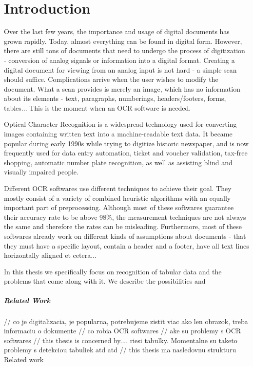 \chapter{Introduction}

Over the last few years, the importance and usage of digital documents has grown rapidly. Today, almost everything can be found in digital form. However, there are still tons of documents that need to undergo the process of digitization - conversion of analog signals or information into a digital format. Creating a digital document for viewing from an analog input is not hard - a simple scan should suffice. Complications arrive when the user wishes to modify the document. What a scan provides is merely an image, which has no information about its elements - text, paragraphs, numberings, headers/footers, forms, tables... This is the moment when an OCR software is needed.

Optical Character Recognition is a widespread technology used for converting images containing written text into a machine-readable text data. It became popular during early 1990s while trying to digitize historic newspaper, and is now frequently used for data entry automation, ticket and voucher validation, tax-free shopping, automatic number plate recognition, as well as assisting blind and visually impaired people.

Different OCR softwares use different techniques to achieve their goal. They mostly consist of a variety of combined heuristic algorithms with an equally important part of preprocessing. Although most of these softwares guarantee their accuracy rate to be above 98\%, the measurement techniques are not always the same and therefore the rates can be misleading.
Furthermore, most of these softwares already work on different kinds of assumptions about documents - that they must have a specific layout, contain a header and a footer, have all text lines horizontally aligned et cetera...

In this thesis we specifically focus on recognition of tabular data and the problems that come along with it. We describe the possibilities and 



\paragraph{Related Work}


// co je digitalizacia, je popularna, potrebujeme zistit viac ako len obrazok,
treba informaciu o dokumente
// co robia OCR softwares
// ake su problemy s OCR softwares
// this thesis is concerned by.... riesi tabulky. Momentalne su taketo problemy s detekciou tabuliek atd atd
// this thesis ma nasledovnu strukturu
Related work



